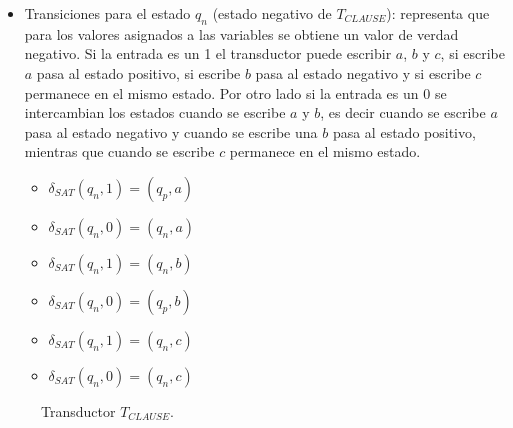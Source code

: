 \documentclass[12pt]{article}
\begin{document}
\begin{itemize}
    \item Transiciones para el estado $q_n$ (estado negativo de $T_{CLAUSE}$): representa que para los valores
          asignados a las variables se obtiene un valor de verdad negativo. Si la entrada es un 1 el 
          transductor puede escribir $a$, $b$ y $c$, si escribe $a$ pasa al estado positivo, si escribe $b$
          pasa al estado negativo y si escribe $c$ permanece en el mismo estado. Por otro lado si la entrada 
          es un 0 se intercambian los estados cuando se escribe $a$ y $b$, es decir cuando se escribe $a$
          pasa al estado negativo y cuando se escribe una $b$ pasa al estado positivo, mientras que cuando 
          se escribe $c$ permanece en el mismo estado.
          \begin{multicols}{2}
              \begin{itemize}
                  \item $\delta_{SAT}(q_{n},1)=(q_{p},a)$
                  \item $\delta_{SAT}(q_{n},0)=(q_{n},a)$
                  \item $\delta_{SAT}(q_{n},1)=(q_{n},b)$
                  \item $\delta_{SAT}(q_{n},0)=(q_{p},b)$
                  \item $\delta_{SAT}(q_{n},1)=(q_{n},c)$
                  \item $\delta_{SAT}(q_{n},0)=(q_{n},c)$
              \end{itemize}
          \end{multicols}
\end{itemize}

\begin{figure}[h]
    \centering  \begin{otherlanguage}{english}
    \end{otherlanguage}
    \caption{Transductor $T_{CLAUSE}$.}
    \label{fig:transducer_clause} %
\end{figure}
\end{document}
